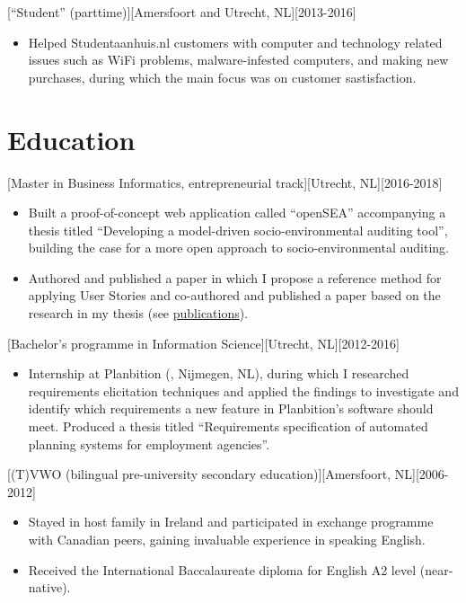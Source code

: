 \documentclass[10pt]{article}
\begin{document}
[\enquote{Student} (parttime)][Amersfoort and
      Utrecht, NL][2013-2016]
\begin{itemize}
      \item Helped Studentaanhuis.nl customers with computer and technology related
            issues such as WiFi problems, malware-infested computers, and making new
            purchases, during which the main focus was on customer sastisfaction.
\end{itemize}

\section{Education}
\label{sec:school}

[Master in Business Informatics,
      entrepreneurial track][Utrecht, NL][2016-2018]
\begin{itemize}
      \item Built a proof-of-concept web application called \enquote{openSEA}
            accompanying a thesis titled \enquote{Developing a model-driven
                  socio-environmental auditing tool}, building the case for a more open approach
            to socio-environmental auditing.
      \item Authored and published a paper in which I propose a reference method for
            applying User Stories and co-authored and published a paper based on the
            research in my thesis (see \hyperref[sec:pubs]{publications}).
\end{itemize}

[Bachelor's programme in Information
      Science][Utrecht, NL][2012-2016]
\begin{itemize}
      \item Internship at Planbition (, Nijmegen, NL), during
            which I researched requirements elicitation techniques and applied the findings
            to investigate and identify which requirements a new feature in Planbition's
            software should meet. Produced a thesis titled \enquote{Requirements
                  specification of automated planning systems for employment agencies}.
\end{itemize}

[(T)VWO (bilingual pre-university secondary
      education)][Amersfoort, NL][2006-2012]
\begin{itemize}
      \item Stayed in host family in Ireland and participated in exchange programme
            with Canadian peers, gaining invaluable experience in speaking English.
      \item Received the International Baccalaureate diploma for English A2 level
            (near-native).
\end{itemize}
\end{document}

